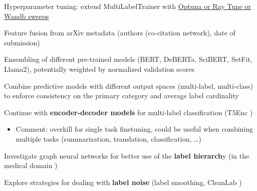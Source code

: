 \documentclass[10pt,letterpaper]{article}
\begin{document}
\begin{todolist}
\item Hyperparameter tuning: extend MultiLabelTrainer with \href{https://huggingface.co/docs/transformers/en/hpo_train}{Optuna or Ray Tune or Wandb sweeps}
\item Feature fusion from arXiv metadata (\eg authors (co-citation network), date of submission)
\item Ensembling of different pre-trained models (\eg BERT, DeBERTa, SciBERT, SetFit, Llama2), potentially weighted by normalized validation scores
\item Combine predictive models with different output spaces (\eg multi-label, multi-class) to enforce consistency on the primary category and average label cardinality
\item Continue with \textbf{encoder-decoder models} for multi-label classification (\eg T5Enc \cite{kementchedjhieva2023exploration})
\begin{itemize}
  \item Comment: overkill for single task finetuning, could be useful when combining multiple tasks (summarization, translation, classification, \ldots)
\end{itemize}
\item Investigate graph neural networks for better use of the \textbf{label hierarch}y (\eg in the medical domain \cite{chi2024graph})
\item Explore strategies for dealing with \textbf{label noise} (\eg label smoothing, CleanLab \cite{kumar2020robust,oyen2022robustness})
\end{todolist}

{\small


}
\end{document}
